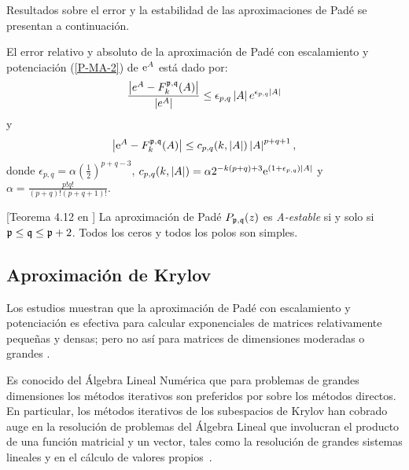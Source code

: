 Resultados sobre el error y la estabilidad de las aproximaciones de Padé se presentan a continuación.

\begin{theorem}
    \label{Conv. Pade}\cite{jimenez2012convergence} El error
    relativo y absoluto de la aproximación de Padé con escalamiento y
    potenciación (\ref{P-MA-2}) de $\mathrm{e}^{A}$ está dado por: 
    \[
    \frac{\left\vert e^{A}-F_{k}^{\mathfrak{p},\mathfrak{q}}(A)\right\vert 
    }{\left\vert e^{A}\right\vert }\leq \epsilon _{p,q}\left\vert 
    A\right\vert e^{\epsilon _{p,q}\left\vert A\right\vert }
    \]%
    y 
    \begin{equation}
    \left\vert \mathrm{e}^{A}-F_{k}^{\mathfrak{p},\mathfrak{q}}(A)\right\vert \leq
    c_{p,q}(k,\left\vert A\right\vert )\left\vert A\right\vert
    ^{p+q+1}, \label{errpade}
    \end{equation}
    donde $\epsilon _{p,q}=\alpha (\frac{1}{2})^{p+q-3}$, $%
    c_{p,q}(k,\left\vert A\right\vert )=\alpha
    2^{-k(p+q)+3}\me{(1+\epsilon _{p,q})\left\vert A\right\vert }$ y $%
    \alpha =\frac{p!q!}{(p+q)!(p+q+1)!}$.
\end{theorem}

\begin{theorem}\label{Stab. Pade}[Teorema 4.12 en \cite{wanner1996solving}] 
    La aproximación de Padé $P_{\mathfrak{p},\mathfrak{q}}(z)$  es \emph{A-estable} si y solo si $\mathfrak{p}\leq \mathfrak{q}\leq \mathfrak{p}+2$. 
    Todos los ceros y todos los polos son simples.
\end{theorem}

\subsection{Aproximación de Krylov}

Los estudios muestran que la aproximación de Padé con escalamiento y potenciación
es efectiva para calcular exponenciales de matrices relativamente pequeñas y densas; pero no así para matrices de dimensiones moderadas o grandes \cite{moler2003nineteen}.

Es conocido del Álgebra Lineal Numérica que para problemas de
grandes dimensiones los métodos iterativos son preferidos por sobre los métodos directos.
En particular,
los métodos iterativos de los subespacios de Krylov han cobrado auge en la resolución de
problemas del Álgebra Lineal que involucran el producto de una función matricial y un vector,
tales como la resolución de grandes sistemas lineales y en el cálculo de valores
propios~\cite{golub2013matrix}.

